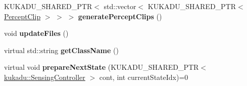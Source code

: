 \begin{DoxyCompactItemize}
\item 
K\+U\+K\+A\+D\+U\+\_\+\+S\+H\+A\+R\+E\+D\+\_\+\+P\+TR$<$ std\+::vector$<$ K\+U\+K\+A\+D\+U\+\_\+\+S\+H\+A\+R\+E\+D\+\_\+\+P\+TR$<$ \hyperlink{classkukadu_1_1PerceptClip}{Percept\+Clip} $>$ $>$ $>$ {\bfseries generate\+Percept\+Clips} ()\hypertarget{classkukadu_1_1ComplexController_afaf3b27706451e42afda6fc3aae0d89c}{}\label{classkukadu_1_1ComplexController_afaf3b27706451e42afda6fc3aae0d89c}

\item 
void {\bfseries update\+Files} ()\hypertarget{classkukadu_1_1ComplexController_a12a8e0f0333997f1a86fbac2721525e6}{}\label{classkukadu_1_1ComplexController_a12a8e0f0333997f1a86fbac2721525e6}

\item 
virtual std\+::string {\bfseries get\+Class\+Name} ()\hypertarget{classkukadu_1_1ComplexController_a4cdc303a9c3c24897b7572eea4917892}{}\label{classkukadu_1_1ComplexController_a4cdc303a9c3c24897b7572eea4917892}

\item 
virtual void {\bfseries prepare\+Next\+State} (K\+U\+K\+A\+D\+U\+\_\+\+S\+H\+A\+R\+E\+D\+\_\+\+P\+TR$<$ \hyperlink{classkukadu_1_1SensingController}{kukadu\+::\+Sensing\+Controller} $>$ cont, int current\+State\+Idx)=0\hypertarget{classkukadu_1_1ComplexController_a4045315a8176ee0e28ee7c726f2cf272}{}\label{classkukadu_1_1ComplexController_a4045315a8176ee0e28ee7c726f2cf272}

\end{DoxyCompactItemize}
